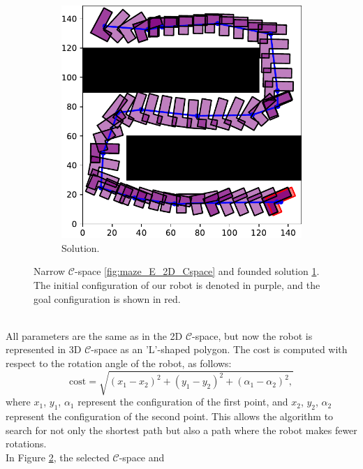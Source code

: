 \documentclass{ctuthesis}
\begin{document}
\begin{figure}[!ht]
\begin{subfigure}[t]{0.49\textwidth}
    \includegraphics[width=\textwidth]{figChap5/RRTstar_ML_Maze_E_2D_solution.pdf}
    \caption{Solution.}
    \label{fig:maze_E_2D_solution} 
\end{subfigure}    
  \caption{Narrow $\mathcal{C}$-space \ref{fig:maze_E_2D_Cspace} and 
  founded solution \ref{fig:maze_E_2D_solution}.
  The initial configuration of our robot is denoted in purple, 
  and the goal configuration is shown in red.}
  \label{fig:maze_E_2D}
\end{figure}
\\
All parameters are the same as in the 2D $\mathcal{C}$-space, 
but now the robot is represented in 3D $\mathcal{C}$-space as an 'L'-shaped polygon. 
The cost is computed with respect to the rotation angle of the robot, as follows:
\begin{equation}
\text{cost} = \sqrt{(x_1 - x_2)^2 + (y_1 - y_2)^2 + (\alpha_1 - \alpha_2)^2,}
\end{equation}
where \( x_1 \), \( y_1 \), \( \alpha_1 \) represent the configuration of the first point, 
and \( x_2 \), \( y_2 \), \( \alpha_2 \) represent the configuration of the second point.
This allows the algorithm to search for not only the shortest path but also a path 
where the robot makes fewer rotations.
\\[12pt]
In Figure \ref{fig:maze_E_2D}, the selected $\mathcal{C}$-space and 
\end{document}
